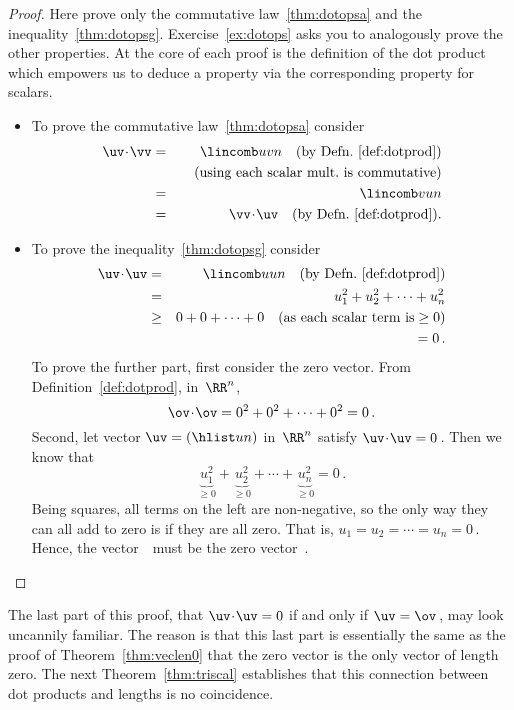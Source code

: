 \begin{proof} 
Here prove only the commutative law~\ref{thm:dotopsa} and the inequality~\ref{thm:dotopsg}.
Exercise~\ref{ex:dotops} asks you to analogously prove the other properties.
At the core of each proof is the definition of the dot product which empowers us to deduce a property via the corresponding property for scalars.
\begin{itemize}
\item To prove the commutative law~\ref{thm:dotopsa} consider
\begin{eqnarray*}
\uv\cdot\vv&=&\lincomb uvn \quad(\text{by Defn.~\ref{def:dotprod}})
\\&&\quad(\text{using each scalar mult.\ is commutative})
\\&=&\lincomb vun
\\&=&\vv\cdot\uv \quad(\text{by Defn.~\ref{def:dotprod}}).
\end{eqnarray*}

\item To prove the inequality~\ref{thm:dotopsg} consider
\begin{eqnarray*}
\uv\cdot\uv&=&\lincomb uun\quad(\text{by Defn.~\ref{def:dotprod}})
\\&=&u_1^2+u_2^2+\cdots+u_n^2
\\&\geq&0+0+\cdots+0 \quad(\text{as each scalar term is}\geq0)
\\&&{}=0\,.
\end{eqnarray*}
To prove the further part, first consider the zero vector.
From Definition~\ref{def:dotprod}, in~\(\RR^n\),
\begin{equation*}
\ov\cdot\ov={0^2+0^2+\cdots+0^2}=0\,.
\end{equation*}
Second, let vector \(\uv=(\hlist un)\) in~\(\RR^n\) satisfy \(\uv\cdot\uv=0\)\,.
Then we know that
\begin{equation*}
\underbrace{u_1^2}_{\geq0}+\underbrace{u_2^2}_{\geq0}
+\cdots+\underbrace{u_n^2}_{\geq0}=0\,.
\end{equation*}
Being squares, all terms on the left are non-negative, so the only way they can all add to zero is if they are all zero.
That is, \(u_1=u_2=\cdots=u_n=0\)\,.
Hence, the vector~\uv\ must be the zero vector~\ov.
\end{itemize}
\end{proof}

The last part of this proof, that \(\uv\cdot\uv=0\) if and only if \(\uv=\ov\)\,, may look uncannily familiar.
The reason is that this last part is essentially the same as the proof of Theorem~\ref{thm:veclen0} that the zero vector is the only vector of length zero.
The next Theorem~\ref{thm:triscal} establishes that this connection between dot products and lengths is no coincidence.




